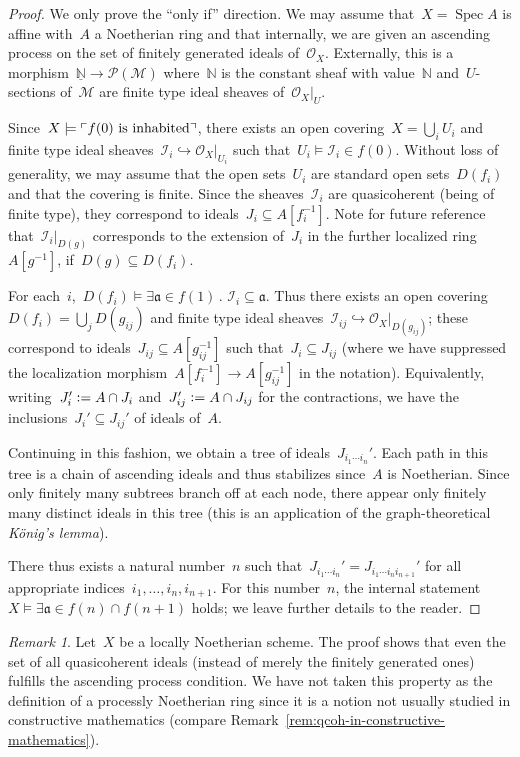 \documentclass[10pt]{amsart}
\theoremstyle{definition}
\theoremstyle{plain}
\theoremstyle{remark}
\newtheorem{rem}[defn]{Remark}
\renewcommand{\O}{\mathcal{O}}
\newcommand{\M}{\mathcal{M}}
\renewcommand{\P}{\mathcal{P}}
\newcommand{\I}{\mathcal{I}}
\newcommand{\NN}{\mathbb{N}}
\newcommand{\aaa}{\mathfrak{a}}
\newcommand{\ul}[1]{\underline{#1}}
\DeclareMathOperator{\Spec}{Spec}
\newcommand{\?}{\,{:}\,}
\renewcommand{\_}{\mathpunct{.}\,}
\newcommand{\speak}[1]{\ulcorner\text{\textnormal{#1}}\urcorner}
\newcommand{\defeq}{\vcentcolon=}
\begin{document}
\begin{proof}We only prove the ``only if'' direction. We may assume that~$X =
\Spec A$ is affine with~$A$ a Noetherian ring and that internally, we are given an
ascending process on the set of finitely generated ideals of~$\O_X$.
Externally, this is a morphism~$\ul{\NN} \to \P(\M)$ where~$\NN$ is the
constant sheaf with value~$\NN$ and~$U$-sections of~$\M$ are finite type ideal
sheaves of~$\O_X|_U$.

Since~$X \models \speak{$f(0)$ is inhabited}$, there exists an open covering~$X
= \bigcup_i U_i$ and finite type ideal sheaves~$\I_i \hookrightarrow
\O_X|_{U_i}$ such that~$U_i \models \I_i \in f(0)$. Without loss of generality,
we may assume that the open sets~$U_i$ are standard open sets~$D(f_i)$ and that
the covering is finite. Since the sheaves~$\I_i$ are quasicoherent (being of finite type), they
correspond to ideals~$J_i \subseteq A[f_i^{-1}]$. Note for future reference
that~$\I_i|_{D(g)}$ corresponds to the extension of~$J_i$ in the further
localized ring~$A[g^{-1}]$, if~$D(g) \subseteq D(f_i)$.

For each~$i$,~$D(f_i) \models \exists \aaa \in f(1)\_ \I_i \subseteq \aaa$.
Thus there exists an open covering~$D(f_i) = \bigcup_j D(g_{ij})$ and finite
type ideal sheaves~$\I_{ij} \hookrightarrow \O_X|_{D(g_{ij})}$; these
correspond to ideals~$J_{ij} \subseteq A[g_{ij}^{-1}]$ such that~$J_i
\subseteq J_{ij}$ (where we have suppressed the localization
morphism~$A[f_i^{-1}] \to A[g_{ij}^{-1}]$ in the notation). Equivalently,
writing~$J_i' \defeq A \cap J_i$ and~$J_{ij}' \defeq A \cap J_{ij}$ for the
contractions, we have the inclusions~$J_i' \subseteq J_{ij}'$ of ideals of~$A$.

Continuing in this fashion, we obtain a tree of ideals~$J_{i_1 \cdots i_n}'$.
Each path in this tree is a chain of ascending ideals and thus stabilizes
since~$A$ is Noetherian. Since only finitely many subtrees branch off at
each node, there appear only finitely many distinct ideals in this tree (this
is an application of the graph-theoretical \emph{König's lemma}).

There thus exists a natural number~$n$ such that~$J_{i_1 \cdots i_n}' = J_{i_1
\cdots i_n i_{n+1}}'$ for all appropriate indices~$i_1,\ldots,i_n,i_{n+1}$.
For this number~$n$, the internal statement~$X \models \exists \aaa \in f(n)
\cap f(n+1)$ holds; we leave further details to the reader.
\end{proof}

\begin{rem}Let~$X$ be a locally Noetherian scheme. The proof shows that even
the set of all quasicoherent ideals (instead of merely the finitely generated
ones) fulfills the ascending process condition. We have not taken this property
as the definition of a processly Noetherian ring since it is a notion not
usually studied in constructive mathematics (compare
Remark~\ref{rem:qcoh-in-constructive-mathematics}).
\end{rem}
\end{document}
